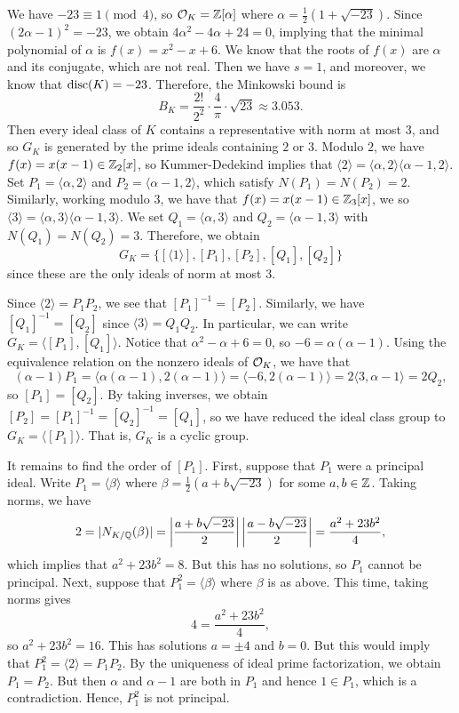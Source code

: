 We have $-23 \equiv 1 \pmod 4$, so ${\cal O}_K = \mathbb{Z}[\alpha]$ where 
$\alpha = \frac12(1 + \sqrt{-23})$. Since $(2\alpha - 1)^2 = -23$, 
we obtain $4\alpha^2 -4\alpha + 24 = 0$, implying that the minimal 
polynomial of $\alpha$ is $f(x) = x^2 - x + 6$. 
We know that the roots of $f(x)$ are $\alpha$ and its conjugate, 
which are not real. Then we have $s = 1$, and moreover, we know that 
$\operatorname{disc}(K) = -23$. Therefore, the Minkowski bound is 
\[ B_K = \frac{2!}{2^2} \cdot \frac{4}{\pi} \cdot \sqrt{23} \approx 3.053. \] 
Then every ideal class of $K$ contains a representative with norm at most $3$,
and so $G_K$ is generated by the prime ideals containing $2$ or $3$. 
Modulo $2$, we have $f(x) = x(x-1) \in \mathbb{Z}_2[x]$, so Kummer-Dedekind 
implies that $\langle 2 \rangle = \langle \alpha, 2 \rangle \langle \alpha-1, 2 \rangle$.
Set $P_1 = \langle \alpha, 2 \rangle$ and $P_2 = \langle \alpha-1, 2 \rangle$,
which satisfy $N(P_1) = N(P_2) = 2$.
Similarly, working modulo $3$, we have that $f(x) = x(x-1) \in \mathbb{Z}_3[x]$, we 
so $\langle 3 \rangle = \langle \alpha, 3 \rangle \langle \alpha-1, 3 \rangle$.
We set $Q_1 = \langle \alpha, 3 \rangle$ and $Q_2 = \langle \alpha-1, 3 \rangle$
with $N(Q_1) = N(Q_2) = 3$. Therefore, we obtain
\[ G_K = \{[\langle 1 \rangle], [P_1], [P_2], [Q_1], [Q_2]\} \] 
since these are the only ideals of norm at most $3$. 

Since $\langle 2 \rangle = P_1P_2$, we see that $[P_1]^{-1} = [P_2]$. 
Similarly, we have $[Q_1]^{-1} = [Q_2]$ since $\langle 3 \rangle = Q_1Q_2$.
In particular, we can write $G_K = \langle [P_1], [Q_1] \rangle$. 
Notice that $\alpha^2 - \alpha + 6 = 0$, so $-6 = \alpha(\alpha - 1)$. 
Using the equivalence relation on the nonzero ideals of ${\cal O}_K$, we 
have that 
\[ (\alpha - 1)P_1 = \langle \alpha(\alpha-1), 2(\alpha-1) \rangle 
= \langle -6, 2(\alpha-1) \rangle = 2\langle 3, \alpha-1 \rangle = 2Q_2, \] 
so $[P_1] = [Q_2]$. By taking inverses, we obtain $[P_2] = [P_1]^{-1} = 
[Q_2]^{-1} = [Q_1]$, so we have reduced the ideal class group to $G_K = 
\langle [P_1] \rangle$. That is, $G_K$ is a cyclic group. 

It remains to find the order of $[P_1]$. First, suppose that $P_1$ 
were a principal ideal. Write $P_1 = \langle \beta \rangle$ where 
$\beta = \frac12(a + b\sqrt{-23})$ for some $a, b \in \mathbb{Z}$. Taking norms, we have 
\[ 2 = |N_{K/\mathbb{Q}}(\beta)| = \left| \frac{a + b\sqrt{-23}}{2} \right| \left| \frac{a - b\sqrt{-23}}{2} \right| 
= \frac{a^2 + 23b^2}{4}, \] 
which implies that $a^2 + 23b^2 = 8$. But this has no solutions, so $P_1$
cannot be principal. Next, suppose that $P_1^2 = \langle \beta \rangle$
where $\beta$ is as above. 
This time, taking norms gives 
\[ 4 = \frac{a^2 + 23b^2}{4}, \] 
so $a^2 + 23b^2 = 16$. This has solutions $a = \pm 4$ and $b = 0$. 
But this would imply that $P_1^2 = \langle 2 \rangle = P_1P_2$. 
By the uniqueness of ideal prime factorization, we obtain
$P_1 = P_2$. But then $\alpha$ 
and $\alpha-1$ are both in $P_1$ and hence $1 \in P_1$, which is a 
contradiction. Hence, $P_1^2$ is not principal.


